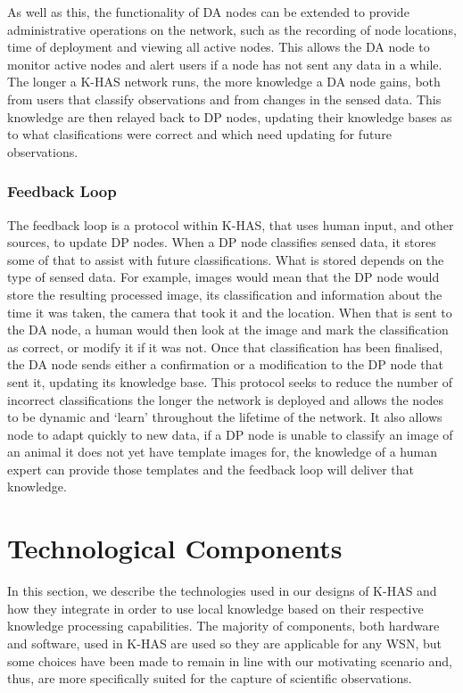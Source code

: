 	As well as this, the functionality of DA nodes can be extended to provide administrative operations on the network, such as the recording of node locations, time of deployment and viewing all active nodes. This allows the DA node to monitor active nodes and alert users if a node has not sent any data in a while. The longer a K-HAS network runs, the more knowledge a DA node gains, both from users that classify observations and from changes in the sensed data. This knowledge are then relayed back to DP nodes, updating their knowledge bases as to what clasifications were correct and which need updating for future observations.

	\subsubsection{Feedback Loop}
	The feedback loop is a protocol within K-HAS, that uses human input, and other sources, to update DP nodes. When a DP node classifies sensed data, it stores some of that to assist with future classifications. What is stored depends on the type of sensed data. For example, images would mean that the DP node would store the resulting processed image, its classification and information about the time it was taken, the camera that took it and the location. When that is sent to the DA node, a human would then look at the image and mark the classification as correct, or modify it if it was not. Once that classification has been finalised, the DA node sends either a confirmation or a modification to the DP node that sent it, updating its knowledge base. This protocol seeks to reduce the number of incorrect classifications the longer the network is deployed and allows the nodes to be dynamic and `learn' throughout the lifetime of the network. It also allows node to adapt quickly to new data, if a DP node is unable to classify an image of an animal it does not yet have template images for, the knowledge of a human expert can provide those templates and the feedback loop will deliver that knowledge.
	
	
	\section{Technological Components}\label{arch:tech}
	In this section, we describe the technologies used in our designs of K-HAS and how they integrate in order to use local knowledge based on their respective knowledge processing capabilities. The majority of components, both hardware and software, used in K-HAS are used so they are applicable for any WSN, but some choices have been made to remain in line with our motivating scenario and, thus, are more specifically suited for the capture of scientific observations.
	
